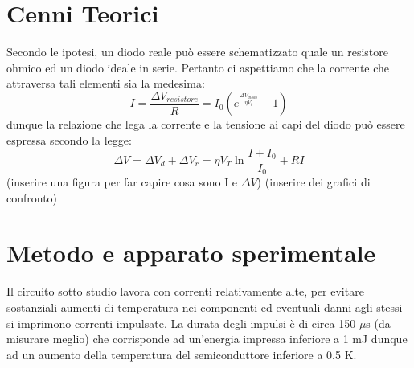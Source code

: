 \documentclass{article}[a4paper, oneside, 11pt]
\begin{document}
\section{Cenni Teorici}
Secondo le ipotesi, un diodo reale può essere schematizzato quale un resistore ohmico ed un diodo ideale in serie. Pertanto ci aspettiamo che la corrente che attraversa tali elementi sia la medesima:
\begin{equation}
I = \frac{\Delta V_{resistore}}{R} = I_0 ( e^{\frac{\Delta V_{diodo}}{\eta V_t}} - 1)
\end{equation}
dunque la relazione che lega la corrente e la tensione ai capi del diodo può essere espressa secondo la legge:
\begin{equation}\label{eq: model}
\Delta V = \Delta V_d + \Delta V_r = \eta V_T  \ln{\frac{I+I_0}{I_0}} + RI
\end{equation}
(inserire una figura per far capire cosa sono I e $\Delta V$)\newline
(inserire dei grafici di confronto)


\section{Metodo e apparato sperimentale}
Il circuito sotto studio lavora con correnti relativamente alte, per evitare sostanziali aumenti di temperatura nei componenti ed eventuali danni agli stessi si imprimono correnti impulsate.
La durata degli impulsi è di circa 150 $\mu$s (da misurare meglio) che corrisponde ad un'energia impressa inferiore a 1 mJ dunque ad un aumento della temperatura del semiconduttore inferiore a 0.5 K.

\end{document}
